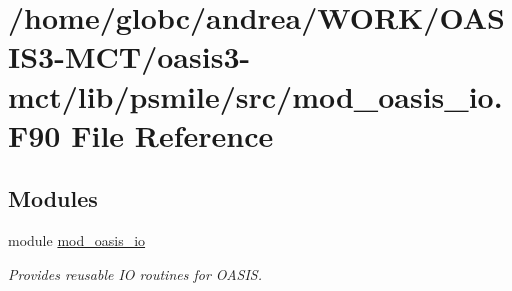 \hypertarget{mod__oasis__io_8_f90}{}\section{/home/globc/andrea/\+W\+O\+R\+K/\+O\+A\+S\+I\+S3-\/\+M\+C\+T/oasis3-\/mct/lib/psmile/src/mod\+\_\+oasis\+\_\+io.F90 File Reference}
\label{mod__oasis__io_8_f90}
\subsection*{Modules}
\begin{DoxyCompactItemize}
\item 
module \hyperlink{namespacemod__oasis__io}{mod\+\_\+oasis\+\_\+io}
\begin{DoxyCompactList}\small\item\em Provides reusable IO routines for O\+A\+S\+IS. \end{DoxyCompactList}\end{DoxyCompactItemize}
